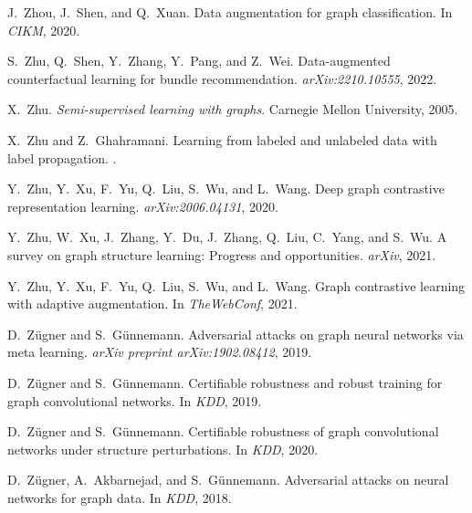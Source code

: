 \documentclass[11pt]{article}
\begin{document}
\begin{thebibliography}{10}
\begin{small}
J.~Zhou, J.~Shen, and Q.~Xuan.
\newblock Data augmentation for graph classification.
\newblock In \emph{CIKM}, 2020.

S.~Zhu, Q.~Shen, Y.~Zhang, Y.~Pang, and Z.~Wei.
\newblock Data-augmented counterfactual learning for bundle recommendation.
\newblock \emph{arXiv:2210.10555}, 2022.

X.~Zhu.
\newblock \emph{Semi-supervised learning with graphs}.
\newblock Carnegie Mellon University, 2005.

X.~Zhu and Z.~Ghahramani.
\newblock Learning from labeled and unlabeled data with label propagation.
.

Y.~Zhu, Y.~Xu, F.~Yu, Q.~Liu, S.~Wu, and L.~Wang.
\newblock Deep graph contrastive representation learning.
\newblock \emph{arXiv:2006.04131}, 2020.

Y.~Zhu, W.~Xu, J.~Zhang, Y.~Du, J.~Zhang, Q.~Liu, C.~Yang, and S.~Wu.
\newblock A survey on graph structure learning: Progress and opportunities.
\newblock \emph{arXiv}, 2021{}.

Y.~Zhu, Y.~Xu, F.~Yu, Q.~Liu, S.~Wu, and L.~Wang.
\newblock Graph contrastive learning with adaptive augmentation.
\newblock In \emph{TheWebConf}, 2021{}.

D.~Z{\"u}gner and S.~G{\"u}nnemann.
\newblock Adversarial attacks on graph neural networks via meta learning.
\newblock \emph{arXiv preprint arXiv:1902.08412}, 2019{}.

D.~Z{\"u}gner and S.~G{\"u}nnemann.
\newblock Certifiable robustness and robust training for graph convolutional
  networks.
\newblock In \emph{KDD}, 2019{}.

D.~Z{\"u}gner and S.~G{\"u}nnemann.
\newblock Certifiable robustness of graph convolutional networks under
  structure perturbations.
\newblock In \emph{KDD}, 2020.

D.~Z{\"u}gner, A.~Akbarnejad, and S.~G{\"u}nnemann.
\newblock Adversarial attacks on neural networks for graph data.
\newblock In \emph{KDD}, 2018.

\end{small}
\end{thebibliography}
\end{document}
